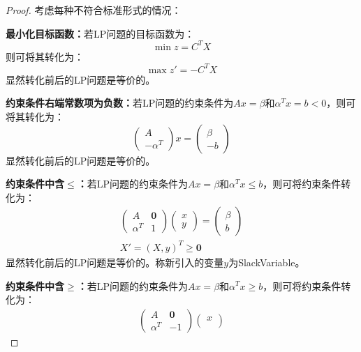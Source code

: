 \begin{proof}
	考虑每种不符合标准形式的情况：\par
	\textbf{最小化目标函数：}若LP问题的目标函数为：
	\begin{equation*}
		\min z=C^TX
	\end{equation*}
	则可将其转化为：
	\begin{equation*}
		\max z'=-C^TX
	\end{equation*}
	显然转化前后的LP问题是等价的。\par
	\textbf{约束条件右端常数项为负数：}若LP问题的约束条件为$Ax=\beta$和$\alpha^Tx=b<0$，则可将其转化为：
	\begin{equation*}
		\begin{pmatrix}
			A \\
			-\alpha^T
		\end{pmatrix}
		x
		=
		\begin{pmatrix}
			\beta \\
			-b
		\end{pmatrix}
	\end{equation*}
	显然转化前后的LP问题是等价的。\par
	\textbf{约束条件中含$\leqslant$：}若LP问题的约束条件为$Ax=\beta$和$\alpha^Tx\leqslant b$，则可将约束条件转化为：
	\begin{gather*}
		\begin{pmatrix}
			A & \mathbf{0} \\
			\alpha^T & 1
		\end{pmatrix}
		\begin{pmatrix}
			x \\
			y
		\end{pmatrix}
		=
		\begin{pmatrix}
			\beta \\
			b
		\end{pmatrix} \\
		X'=(X,y)^T\geqslant\mathbf{0}
	\end{gather*}
	显然转化前后的LP问题是等价的。称新引入的变量$y$为\gls{SlackVariable}。\par
	\textbf{约束条件中含$\geqslant$：}若LP问题的约束条件为$Ax=\beta$和$\alpha^Tx\geqslant b$，则可将约束条件转化为：
	\begin{gather*}
		\begin{pmatrix}
			A & \mathbf{0} \\
			\alpha^T & -1
		\end{pmatrix}
		\begin{pmatrix}
			x \\

\end{pmatrix}
\end{gather*}
\end{proof}
